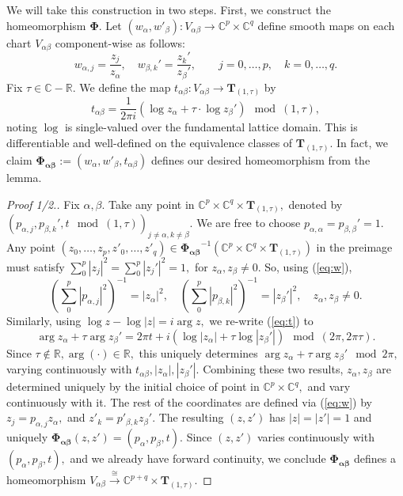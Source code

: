 We will take this construction in two steps. First, we construct the homeomorphism $\mathbf{\Phi}.$ Let $(w_\alpha, w'_\beta):V_{\alpha \beta} \rightarrow \mathbb{C}^p \times \mathbb{C}^q$ define smooth maps on each chart $V_{\alpha \beta}$ component-wise as follows:
    \[
    w_{\alpha, j} = \frac{z_j}{z_\alpha}, \quad w_{\beta, k}' = \frac{z_k'}{z_\beta'}, \qquad j = 0,\dots, p, \quad  k = 0,\dots, q. \label{eq:w}\tag{I}
    \]
    Fix $\tau \in \mathbb{C} - \mathbb{R}.$ We define the map $t_{\alpha\beta}:V_{\alpha\beta} \rightarrow \mathbf{T}_{(1, \tau)}$ by
    \[
    t_{\alpha \beta} = \frac{1}{2\pi i}(\log z_\alpha + \tau \cdot \log z_\beta')\mod (1,\tau),\label{eq:t}\tag{II}
    \]
    noting $\log$ is single-valued over the fundamental lattice domain. This is differentiable and well-defined on the equivalence classes of $\mathbf{T}_{(1,\tau)}.$ In fact, we claim $\mathbf{\Phi_{\alpha\beta}} := (w_\alpha, w'_\beta, t_{\alpha \beta})$ defines our desired homeomorphism from the lemma. 
    

    \begin{proof}[Proof 1/2.]
    Fix $\alpha, \beta.$ Take any point in $\mathbb{C}^p \times \mathbb{C}^q\times \mathbf{T}_{(1,\tau)},$ denoted by $(p_{\alpha, j}, p_{\beta, k}', t\mod (1,\tau))_{j\neq \alpha, k\neq \beta}.$ We are free to choose $p_{\alpha, \alpha} = p_{\beta, \beta}' = 1.$ Any point $(z_0, \dots, z_p, z'_0, \dots, z'_q) \in \mathbf{\Phi_{\alpha\beta}}^{-1}(\mathbb{C}^p \times \mathbb{C}^q \times \mathbf{T}_{(1,\tau)})$ in the preimage must satisfy $\sum_0^p |z_j|^2 = \sum_0^p |z_j'|^2 = 1,$ for $z_\alpha, z_\beta \neq 0.$ So, using (\ref{eq:w}),
    \[
    \left(\sum_0^p |p_{\alpha, j}|^2\right)^{-1} = |z_\alpha|^2, \quad \left(\sum_0^p |p_{\beta, k}|^2\right)^{-1} = |z_\beta '|^2,\quad  z_\alpha, z_\beta \neq 0.
    \]
    Similarly, using $\log z -\log |z|= i\arg z,$ we re-write (\ref{eq:t}) to
    \[
    \arg z_\alpha + \tau \arg z_\beta' = 2\pi t + i(\log |z_\alpha| + \tau \log |z_\beta'|) \mod(2\pi, 2\pi \tau).
    \]
    Since $\tau \notin \mathbb{R}, \arg (\cdot) \in \mathbb{R},$ this uniquely determines $\arg z_\alpha + \tau \arg z_\beta'\mod 2\pi,$ varying continuously with $t_{\alpha \beta}, |z_\alpha|, |z_\beta'|.$ Combining these two results, $z_\alpha, z_\beta$ are determined uniquely by the initial choice of point in $\mathbb{C}^p\times \mathbb{C}^q,$ and vary continuously with it. The rest of the coordinates are defined via (\ref{eq:w}) by $z_j = p_{\alpha, j}z_\alpha,$ and $z'_k = p'_{\beta, k} z_\beta '.$ The resulting $(z, z')$ has $|z| = |z'| = 1$ and uniquely $\mathbf{\Phi_{\alpha\beta}}(z,z') = (p_\alpha, p_\beta, t).$ Since $(z, z')$ varies continuously with $(p_\alpha, p_\beta, t),$ and we already have forward continuity, we conclude $\mathbf{\Phi_{\alpha\beta}}$ defines a homeomorphism $V_{\alpha\beta} \xrightarrow{\cong} \mathbb{C}^{p+q}\times \mathbf{T}_{(1,\tau)}.$
\end{proof}

